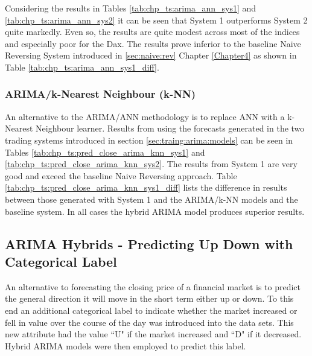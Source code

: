 Considering the results in Tables \ref{tab:chp_ts:arima_ann_sys1} and \ref{tab:chp_ts:arima_ann_sys2} it can be seen that System 1 outperforms System 2 quite markedly. Even so, the results are quite modest across most of the indices and especially poor for the Dax. The results prove inferior to the baseline Naive Reversing System introduced in \ref{sec:naive:rev} Chapter \ref{Chapter4} as shown in Table \ref{tab:chp_ts:arima_ann_sys1_diff}.



\subsubsection{ARIMA/k-Nearest Neighbour (k-NN)}
An alternative to the ARIMA/ANN methodology is to replace ANN with a k-Nearest Neighbour learner. Results from using the forecasts generated in the two trading systems introduced in section \ref{sec:traing:arima:models} can be seen in Tables \ref{tab:chp_ts:pred_close_arima_knn_sys1} and \ref{tab:chp_ts:pred_close_arima_knn_sys2}. The results from System 1 are very good and exceed the baseline Naive Reversing approach. Table \ref{tab:chp_ts:pred_close_arima_knn_sys1_diff} lists the difference in results between those generated with System 1 and the ARIMA/k-NN models and the baseline system. In all cases the hybrid ARIMA model produces superior results.



\subsection{ARIMA Hybrids - Predicting Up Down with Categorical Label}
An alternative to forecasting the closing price of a financial market is to predict the general direction it will move in the short term either up or down. To this end an additional categorical label to indicate whether the market increased or fell in value over the course of the day was introduced into the data sets. This new attribute had the value  \textquotedblleft U" if the market increased and \textquotedblleft D" if it decreased. Hybrid ARIMA models were then employed to predict this label.

